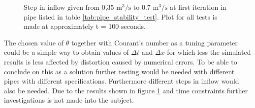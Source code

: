 \begin{figure}[H]
 \centering
 
\caption{Step in inflow given from 0,35 $\text{m}^\text{3}/ \text{s}$ to 0.7 $\text{m}^\text{3}/ \text{s}$ at first iteration in pipe listed in table \ref{tab:pipe_stability_test}. Plot for all tests is made at approximately t = 100 seconds.}
\label{fig:stability_test_theta_0_65}
\end{figure}

The chosen value of $\theta$ together with Courant's number as a tuning parameter could be a simple way to obtain values of $\Delta t$ and $\Delta x$ for which less the simulated results is less affected by distortion caused by numerical errors. To be able to conclude on this as a solution further testing would be needed with different pipes with different specifications. Furthermore different steps in inflow would also be needed. Due to the results shown in figure \ref{fig:stability_test_theta_0_65} and time constraints further investigations is not made into the subject.   


